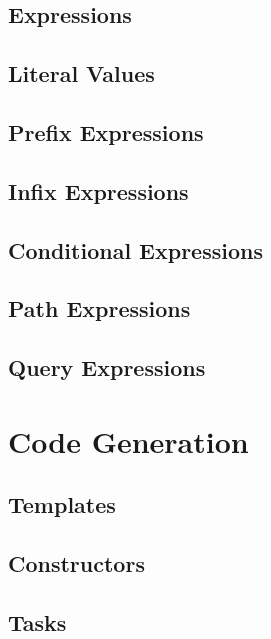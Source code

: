 \documentclass[a4paper,oneside,12pt, extrafontsizes]{memoir}
\theoremstyle{definition}
\theoremstyle{definition}
\theoremstyle{definition}
\theoremstyle{definition}
\begin{document}
\chapter{Expressions}
\label{ch:expressions}


\chapter{Literal Values}
\label{ch:literals}

\chapter{Prefix Expressions}
\label{ch:prefix}

\chapter{Infix Expressions}
\label{ch:infix}

\chapter{Conditional Expressions}
\label{ch:conditionals}

\chapter{Path Expressions}
\label{ch:paths}

\chapter{Query Expressions}
\label{ch:queries}

\part{Code Generation}

\chapter{Templates}
\label{sec:templates}

\chapter{Constructors}
\label{sec:constructors}

\chapter{Tasks}
\label{sec:tasks}
\end{document}
